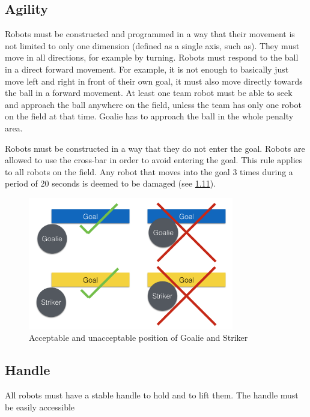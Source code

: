 \documentclass{article}
\begin{document}
\subsection{Agility \label{ref-agility}}

Robots must be constructed and programmed in a way that their movement is not
limited to only one dimension (defined as a single axis, such as). They must
move in all directions, for example by turning. Robots must respond to the ball
in a direct forward movement. For example, it is not enough to basically just
move left and right in front of their own goal, it must also move directly
towards the ball in a forward movement. At least one team robot must be able to
seek and approach the ball anywhere on the field, unless the team has only one
robot on the field at that time. Goalie has to approach the ball in the whole
penalty area.

Robots must be constructed in a way that they do not enter the goal. Robots are
allowed to use the cross-bar in order to avoid entering the goal. This rule
applies to all robots on the field. Any robot that moves into the goal 3 times
during a period of 20 seconds is deemed to be damaged (see
\hyperref[ref-012]{1.11}).

\begin{figure}[H]
    \centering
    \includegraphics[width=0.8\textwidth]{media/image3.png}
    \caption{Acceptable and unacceptable position of Goalie and Striker}
    \label{fig:robot_in_goal}
\end{figure}

\subsection{ Handle \label{ref-handle}}

All robots must have a stable  handle to
hold and to lift them. The handle must be easily accessible 
\end{document}

